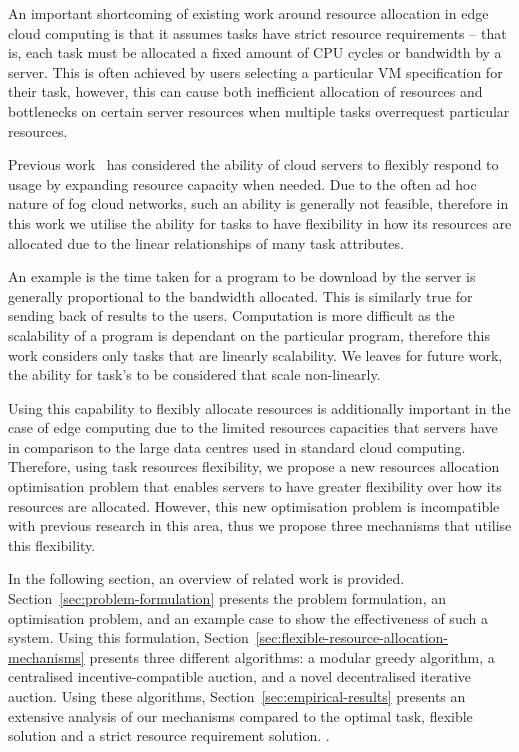 An important shortcoming of existing work around resource allocation in edge cloud computing is that it assumes tasks
have strict resource requirements -- that is, each task must be allocated a fixed amount of CPU cycles or bandwidth by a
server. This is often achieved by users selecting a particular VM specification for their task, however, this can cause
both inefficient allocation of resources and bottlenecks on certain server resources when multiple tasks overrequest
particular resources.

Previous work~\cite{ServerElasticity} has considered the ability of cloud servers to flexibly respond to usage by
expanding resource capacity when needed. Due to the often ad hoc nature of fog cloud networks, such an ability is
generally not feasible, therefore in this work we utilise the ability for tasks to have flexibility in how its
resources are allocated due to the linear relationships of many task attributes.

An example is the time taken for a program to be download by the server is
generally proportional to the bandwidth allocated. This is similarly true for sending back of results to the users.
Computation is more difficult as the scalability of a program is dependant on the particular program, therefore this
work considers only tasks that are linearly scalability. We leaves for future work, the ability for task's to be
considered that scale non-linearly.

Using this capability to flexibly allocate resources is additionally important in the case of edge computing due to the
limited resources capacities that servers have in comparison to the large data centres used in standard cloud computing.
Therefore, using task resources flexibility, we propose a new resources allocation optimisation problem that enables
servers to have greater flexibility over how its resources are allocated. However, this new optimisation problem is
incompatible with previous research in this area, thus we propose three mechanisms that utilise this flexibility.

In the following section, an overview of related work is provided. Section~\ref{sec:problem-formulation} presents the
problem formulation, an optimisation problem, and an example case to show the effectiveness of such a system. Using this
formulation, Section~\ref{sec:flexible-resource-allocation-mechanisms} presents three different algorithms: a modular
greedy algorithm, a centralised incentive-compatible auction, and a novel decentralised iterative auction. Using these
algorithms, Section~\ref{sec:empirical-results} presents an extensive analysis of our mechanisms compared to the optimal
task, flexible solution and a strict resource requirement solution. .
